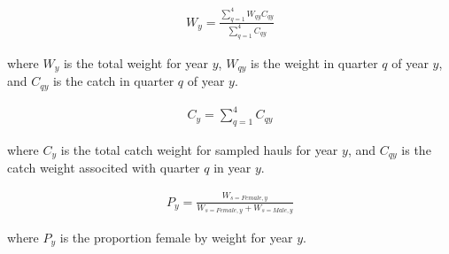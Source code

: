 \begin{align} \label{eq:totalyearwt}
W_y=\frac{\sum\limits_{q=1}^{4}W_{qy}C_{qy}}{\sum\limits_{q=1}^{4}C_{qy}}
\end{align}
\begin{addmargin}[3em]{1em}
where $W_y$ is the total weight for year $y$, $W_{qy}$ is the weight in quarter $q$ of year $y$, and $C_{qy}$ is the catch in quarter $q$ of year $y$.
\end{addmargin}

\begin{align} \label{eq:totalyearcatchwt}
C_y=\sum\limits_{q=1}^{4}C_{qy}
\end{align}
\begin{addmargin}[3em]{1em}
where $C_y$ is the total catch weight for sampled hauls for year $y$, and $C_{qy}$ is the catch weight associted with quarter $q$ in year $y$.
\end{addmargin}

\begin{align} \label{eq:propfemale}
P_y=\frac{W_{s=Female,y}}{W_{s=Female,y}+W_{s=Male,y}}
\end{align}
\begin{addmargin}[3em]{1em}
where $P_y$ is the proportion female by weight for year $y$.
\end{addmargin}

